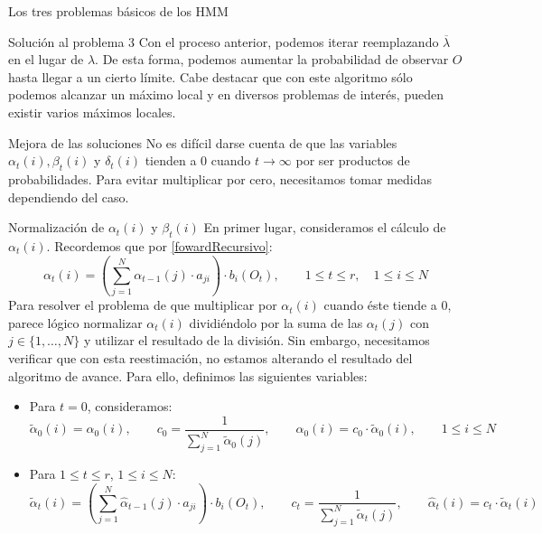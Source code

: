 \begin{section}{Los tres problemas básicos de los HMM}
\begin{subsection}{Solución al problema 3}
Con el proceso anterior, podemos iterar reemplazando $\overline{\lambda}$ en el lugar de $\lambda$. De esta forma, podemos aumentar la probabilidad de observar $O$ hasta llegar a un cierto límite. Cabe destacar que con este algoritmo sólo podemos alcanzar un máximo local y en diversos problemas de interés, pueden existir varios máximos locales.
\end{subsection}
\end{section}

\begin{section}{Mejora de las soluciones}
No es difícil darse cuenta de que las variables $\alpha_t(i), \beta_t(i)$ y $\delta_t(i)$ tienden a $0$ cuando $t\rightarrow\infty$ por ser productos de probabilidades. Para evitar multiplicar por cero, necesitamos tomar medidas dependiendo del caso.
\begin{subsection}{Normalización de $\alpha_t(i)$ y $\beta_t(i)$}
En primer lugar, consideramos el cálculo de $\alpha_t(i)$. Recordemos que por \eqref{fowardRecursivo}:
\[\alpha_{t}(i)=\left(\sum_{j=1}^N\alpha_{t-1}(j)\cdot a_{ji}\right)\cdot b_i(O_{t}), \qquad 1\leq t\leq r , \quad 1\leq i\leq N\]
Para resolver el problema de que multiplicar por $\alpha_t(i)$ cuando éste tiende a $0$, parece lógico normalizar $\alpha_t(i)$ dividiéndolo por la suma de las $\alpha_t(j)$ con $j\in\{1,\dots,N\}$ y utilizar el resultado de la división. Sin embargo, necesitamos verificar que con esta reestimación, no estamos alterando el resultado del algoritmo de avance. Para ello, definimos las siguientes variables:
\begin{itemize}
    \item Para $t=0$, consideramos:
        \begin{equation*}
            \tilde{\alpha}_0(i)=\alpha_0(i), \qquad c_0=\dfrac{1}{\displaystyle\sum_{j=1}^N\tilde{\alpha}_0(j)}, \qquad \hat{\alpha}_0(i)=c_0\cdot\tilde{\alpha}_0(i) ,\qquad 1\leq i\leq N
        \end{equation*}
    \item Para $1\leq t\leq r$, $1\leq i\leq N$:
        \begin{equation*}
            \tilde{\alpha}_t(i)=\left(\sum_{j=1}^N \hat{\alpha}_{t-1}(j)\cdot a_{ji}\right)\cdot b_i(O_t), \qquad
            c_t=\dfrac{1}{\displaystyle\sum_{j=1}^N\tilde{\alpha}_t(j)}, \qquad
            \hat{\alpha}_t(i)=c_t\cdot\tilde{\alpha}_t(i)
        \end{equation*}
\end{itemize}
\begin{proposition} \label{fórmulaAlphaMejorada}

\end{proposition}
\end{subsection}
\end{section}
